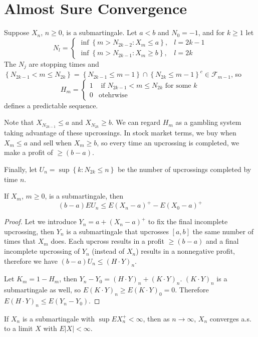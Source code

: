 \section{Almost Sure Convergence}
Suppose $X_n$, $n\ge0$, is a submartingale. Let $a<b$ and $N_0=-1$, and for $k\ge 1$ let \[ N_l=\left\{\begin{matrix}
\inf\left \{ m>N_{2k-2}:X_m\le a \right \},   &l=2k-1\\
\inf\left \{ m>N_{2k-1}:X_m\ge b \right \},&l=2k
\end{matrix}\right.\]
The $N_j$ are stopping times and $\left \{ N_{2k-1}<m\le N_{2k} \right \} =\left \{ N_{2k-1}\le m-1\right \} \cap\left \{ N_{2k}\le m-1 \right \}^c \in\mathcal{F}_{m-1}$, so \[H_m=\left\{\begin{matrix}
 1 & \text{ if }N_{2k-1}<m\le N_{2k} \text{ for some }k\\
 0& \text{otehrwise}
\end{matrix}\right.\]
defines a predictable sequence.\par
Note that $X_{N_{2k-1} }\le a$ and $X_{N_{2k}}\ge b$. We can regard $H_m$ as a gambling system taking advantage of these upcrossings. In stock market terms, we buy when $X_m\le a$ and sell when $X_m\ge b$, so every time an upcrossing is completed, we make a profit of $\ge (b-a)$. \par
Finally, let $U_n=\sup\left\{k:N_{2k}\le n\right\}$ be the number of upcrossings completed by time $n$.
\begin{theorem}
If $X_m$, $m\ge0$, is a submartingale, then \[(b-a)EU_n\le E(X_n-a)^+-E(X_0-a)^+\]
\end{theorem}
\begin{proof}
Let we introduce $Y_n=a+(X_n-a)^+$ to fix the final incomplete upcrossing, then $Y_n$ is a submartingale that upcrosses $[a,b]$ the same number of times that $X_m$ does. Each upcross results in a profit $\ge(b-a)$ and a final incomplete upcrossing of $Y_n$ (instead of $X_n$) results in a nonnegative profit, therefore we have $(b-a)U_n\le (H\cdot Y)_n$.\par
Let $K_m=1-H_m$, then $Y_n-Y_0=(H\cdot Y)_n+(K\cdot Y)_n$. $(K\cdot Y)_n$ is a submartingale as well, so $E(K\cdot Y)_n\ge E(K\cdot Y)_0=0$. Therefore $E(H\cdot Y)_n\le E(Y_n-Y_0)$.
\end{proof}
\begin{theorem}
If $X_n$ is a submartingale with $\sup EX_n^+<\infty$, then as $n\to\infty$, $X_n$ converges a.s. to a limit $X$ with $E\left|X\right|<\infty$.
\end{theorem}
